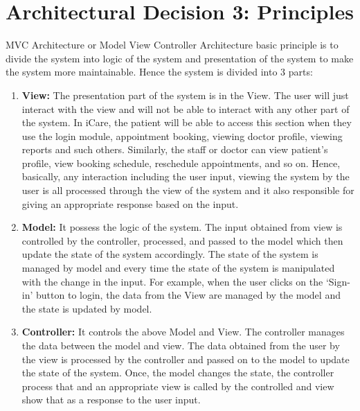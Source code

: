 \documentclass[a4paper,12pt]{report}
\begin{document}
\section*{Architectural Decision 3: Principles}
MVC Architecture or Model View Controller Architecture basic principle is to divide the system into logic of the system and presentation of the system to make the system more maintainable. Hence the system is divided into 3 parts: 

\begin{enumerate}
    \item \textbf{View:} The presentation part of the system is in the View. The user will just interact with the view and will not be able to interact with any other part of the system. In iCare, the patient will be able to access this section when they use the login module, appointment booking, viewing doctor profile, viewing reports and such others. Similarly, the staff or doctor can view patient’s profile, view booking schedule, reschedule appointments, and so on. Hence, basically, any interaction including the user input, viewing the system by the user is all processed through the view of the system and it also responsible for giving an appropriate response based on the input.
    
    \item \textbf{Model:} It possess the logic of the system. The input obtained from view is controlled by the controller, processed, and passed to the model which then update the state of the system accordingly. The state of the system is managed by model and every time the state of the system is manipulated with the change in the input. For example, when the user clicks on the ‘Sign-in’ button to login, the data from the View are managed by the model and the state is updated by model.
    
    \item \textbf{Controller:} It controls the above Model and View. The controller manages the data between the model and view. The data obtained from the user by the view is processed by the controller and passed on to the model to update the state of the system. Once, the model changes the state, the controller process that and an appropriate view is called by the controlled and view show that as a response to the user input.
\end{enumerate}


\end{document}
